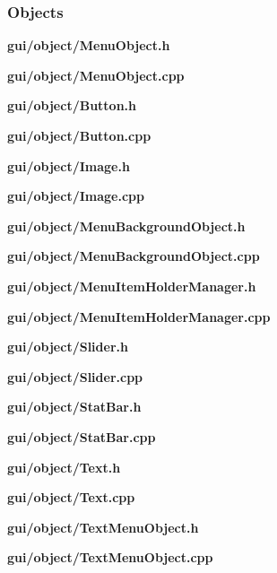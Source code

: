 \documentclass[../Main.tex]{subfiles}
\begin{document}
        \subsubsection{Objects}
            \textbf{gui/object/MenuObject.h}
            
            \textbf{gui/object/MenuObject.cpp}
            

            \textbf{gui/object/Button.h}
            
            \textbf{gui/object/Button.cpp}
            

            \textbf{gui/object/Image.h}
            
            \textbf{gui/object/Image.cpp}
            

            \textbf{gui/object/MenuBackgroundObject.h}
            
            \textbf{gui/object/MenuBackgroundObject.cpp}
            

            \textbf{gui/object/MenuItemHolderManager.h}
            
            \textbf{gui/object/MenuItemHolderManager.cpp}
            

            \textbf{gui/object/Slider.h}
            
            \textbf{gui/object/Slider.cpp}
            

            \textbf{gui/object/StatBar.h}
            
            \textbf{gui/object/StatBar.cpp}
            

            \textbf{gui/object/Text.h}
            
            \textbf{gui/object/Text.cpp}
            

            \textbf{gui/object/TextMenuObject.h}
            
            \textbf{gui/object/TextMenuObject.cpp}
            
\end{document}
